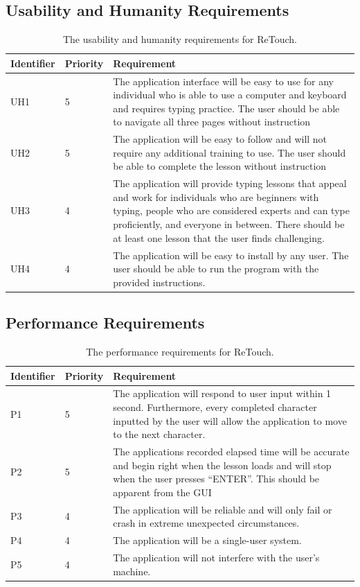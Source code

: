 \documentclass[12pt, titlepage]{article}
\begin{document}
\subsection{Usability and Humanity Requirements}

\begin{table}[H]
  \caption{The usability and humanity requirements for ReTouch.}
\begin{tabular}{ |m{2cm}|m{1.8cm}|m{9.4cm}| }
    \hline
    \textbf{Identifier} & \textbf{Priority} & \textbf{Requirement} \\ 
    \hline
    UH1 & 5 & The application interface will be easy to use for any individual who is able to use a computer and keyboard and requires typing practice. The user should be able to navigate all three pages without instruction\\
    \hline
    UH2 & 5 & The application will be easy to follow and will not require any additional training to use. The user should be able to complete the lesson without instruction\\ 
    \hline
    UH3 & 4 & The application will provide typing lessons that appeal and work for individuals who are beginners with typing, people who are considered experts and can type proficiently, and everyone in between. There should be at least one lesson that the user finds challenging.\\
    \hline
    UH4 & 4 & The application will be easy to install by any user. The user should be able to run the program with the provided instructions.\\
    \hline
\end{tabular}
\end{table}

\subsection{Performance Requirements}

\begin{table}[H]
  \caption{The performance requirements for ReTouch.}
\begin{tabular}{ |m{2cm}|m{1.8cm}|m{9.4cm}| }
    \hline
    \textbf{Identifier} & \textbf{Priority} & \textbf{Requirement} \\ 
    \hline
    P1 & 5 & The application will respond to user input within 1 second. Furthermore, every completed character inputted by the user will allow the application to move to the next character. \\
    \hline
    P2 & 5 & The applications recorded elapsed time will be accurate and begin right when the lesson loads and will stop when the user presses “ENTER”. This should be apparent from the GUI \\ 
    \hline
    P3 & 4 & The application will be reliable and will only fail or crash in extreme unexpected circumstances. \\
    \hline
    P4 & 4 & The application will be a single-user system. \\
    \hline
    P5 & 4 & The application will not interfere with the user's machine. \\
    \hline
\end{tabular}
\end{table}
\end{document}
